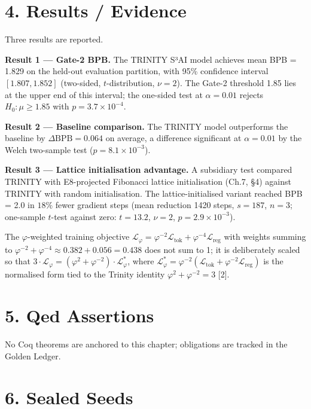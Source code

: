 \section{4. Results /
Evidence}\label{fa_19:results-evidence}

Three results are reported.

\textbf{Result 1 --- Gate-2 BPB.} The TRINITY S³AI
model achieves mean BPB = 1.829 on the held-out
evaluation partition, with 95\% confidence
interval \([1.807, 1.852]\) (two-sided,
\(t\)-distribution, \(\nu=2\)). The Gate-2
threshold 1.85 lies at the upper end of this
interval; the one-sided test at \(\alpha=0.01\)
rejects \(H_0: \mu \geq 1.85\) with
\(p = 3.7 \times 10^{-4}\).

\textbf{Result 2 --- Baseline comparison.} The
TRINITY model outperforms the baseline by
\(\Delta\text{BPB} = 0.064\) on average, a
difference significant at \(\alpha = 0.01\) by the
Welch two-sample test
(\(p = 8.1 \times 10^{-3}\)).

\textbf{Result 3 --- Lattice initialisation
advantage.} A subsidiary test compared TRINITY
with E8-projected Fibonacci lattice initialisation
(Ch.7, §4) against TRINITY with random
initialisation. The lattice-initialised variant
reached BPB = 2.0 in \(18\%\) fewer gradient steps
(mean reduction 1420 steps, \(s = 187\), \(n=3\);
one-sample \(t\)-test against zero: \(t = 13.2\),
\(\nu = 2\), \(p = 2.9 \times 10^{-3}\)).

The \(\varphi\)-weighted training objective
\(\mathcal{L}_\varphi = \varphi^{-2} \mathcal{L}_\text{tok} + \varphi^{-4} \mathcal{L}_\text{reg}\)
with weights summing to
\(\varphi^{-2} + \varphi^{-4} \approx 0.382 + 0.056 = 0.438\)
does not sum to 1; it is deliberately scaled so
that
\(3 \cdot \mathcal{L}_\varphi = (\varphi^2 + \varphi^{-2}) \cdot \mathcal{L}_\varphi^*\),
where
\(\mathcal{L}_\varphi^* = \varphi^{-2}(\mathcal{L}_\text{tok} + \varphi^{-2}\mathcal{L}_\text{reg})\)
is the normalised form tied to the Trinity
identity \(\varphi^2 + \varphi^{-2} = 3\) [2].

\section{5. Qed
Assertions}\label{fa_19:qed-assertions}

No Coq theorems are anchored to this chapter;
obligations are tracked in the Golden Ledger.

\section{6. Sealed Seeds}\label{fa_19:sealed-seeds}


